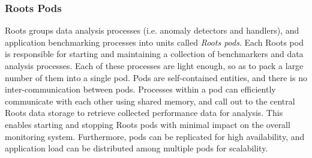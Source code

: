 
\subsubsection{Roots Pods}
\label{sec:process_mgt}


Roots groups data analysis processes (i.e. anomaly detectors and handlers), 
and application benchmarking processes into units called \textit{Roots pods}. 
Each Roots pod is responsible for starting and maintaining a collection of
benchmarkers and data analysis processes. 
Each of these processes are light enough, so as to pack a large number of them
into a single pod. Pods are self-contained entities, and there is no inter-communication
between pods. 
Processes within a pod can efficiently communicate with each other 
using shared memory, and call out to the central Roots data storage to retrieve 
collected performance data for analysis. This enables starting and stopping 
Roots pods with minimal impact on the overall monitoring system. Furthermore, pods
can be replicated for high availability, and application load can be distributed
among multiple pods for scalability.

